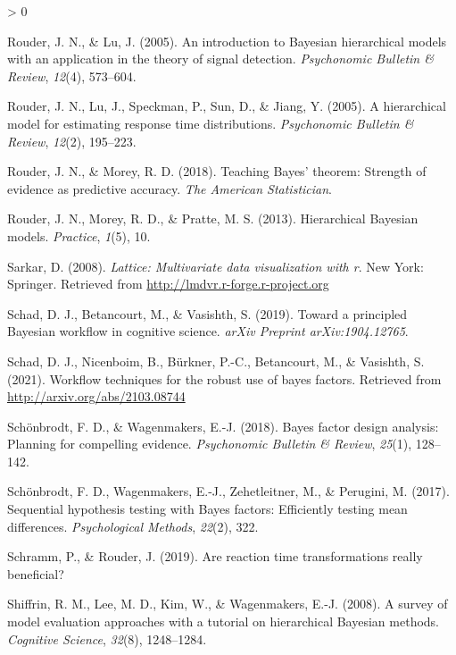 \documentclass[
  english,
  doc,floatsintext]{apa6}
\newlength{\cslhangindent}
\newenvironment{CSLReferences}[2] %
 {%
  \setlength{\parindent}{0pt}
  \ifodd #1 \everypar{\setlength{\hangindent}{\cslhangindent}}\ignorespaces\fi
  \ifnum #2 > 0
  \setlength{\parskip}{#2\baselineskip}
  \fi
 }%
 {}
\begin{document}
\begin{CSLReferences}{1}{0}
\leavevmode\hypertarget{ref-rouder2005introduction}{}%
Rouder, J. N., \& Lu, J. (2005). An introduction to {Bayesian} hierarchical models with an application in the theory of signal detection. \emph{Psychonomic Bulletin \& Review}, \emph{12}(4), 573--604.

\leavevmode\hypertarget{ref-rouder2005hierarchical}{}%
Rouder, J. N., Lu, J., Speckman, P., Sun, D., \& Jiang, Y. (2005). A hierarchical model for estimating response time distributions. \emph{Psychonomic Bulletin \& Review}, \emph{12}(2), 195--223.

\leavevmode\hypertarget{ref-rouder2018teaching}{}%
Rouder, J. N., \& Morey, R. D. (2018). Teaching {Bayes}' theorem: Strength of evidence as predictive accuracy. \emph{The American Statistician}.

\leavevmode\hypertarget{ref-rouder2013hierarchical}{}%
Rouder, J. N., Morey, R. D., \& Pratte, M. S. (2013). Hierarchical {Bayesian} models. \emph{Practice}, \emph{1}(5), 10.

\leavevmode\hypertarget{ref-R-lattice}{}%
Sarkar, D. (2008). \emph{Lattice: Multivariate data visualization with r}. New York: Springer. Retrieved from \url{http://lmdvr.r-forge.r-project.org}

\leavevmode\hypertarget{ref-schad2019toward}{}%
Schad, D. J., Betancourt, M., \& Vasishth, S. (2019). Toward a principled {Bayesian} workflow in cognitive science. \emph{arXiv Preprint arXiv:1904.12765}.

\leavevmode\hypertarget{ref-schad2021workflow}{}%
Schad, D. J., Nicenboim, B., Bürkner, P.-C., Betancourt, M., \& Vasishth, S. (2021). Workflow techniques for the robust use of bayes factors. Retrieved from \url{http://arxiv.org/abs/2103.08744}

\leavevmode\hypertarget{ref-schonbrodt2018bayes}{}%
Schönbrodt, F. D., \& Wagenmakers, E.-J. (2018). Bayes factor design analysis: Planning for compelling evidence. \emph{Psychonomic Bulletin \& Review}, \emph{25}(1), 128--142.

\leavevmode\hypertarget{ref-schonbrodt2017sequential}{}%
Schönbrodt, F. D., Wagenmakers, E.-J., Zehetleitner, M., \& Perugini, M. (2017). Sequential hypothesis testing with {Bayes} factors: Efficiently testing mean differences. \emph{Psychological Methods}, \emph{22}(2), 322.

\leavevmode\hypertarget{ref-schramm2019reaction}{}%
Schramm, P., \& Rouder, J. (2019). Are reaction time transformations really beneficial?

\leavevmode\hypertarget{ref-shiffrin2008survey}{}%
Shiffrin, R. M., Lee, M. D., Kim, W., \& Wagenmakers, E.-J. (2008). A survey of model evaluation approaches with a tutorial on hierarchical {Bayesian} methods. \emph{Cognitive Science}, \emph{32}(8), 1248--1284.


\end{CSLReferences}
\end{document}
